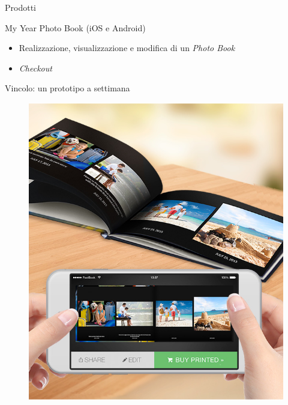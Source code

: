 \begin{frame}{Prodotti}
\begin{minipage}{0.75\textwidth}
\begin{block}{My Year Photo Book (iOS e Android)}
					\begin{itemize}
						\item Realizzazione, visualizzazione e modifica di un \emph{Photo Book}
						\item \emph{Checkout}
					\end{itemize}
					\alert{Vincolo}: un prototipo a settimana
				\end{block}
			\end{minipage}
			\begin{minipage}{0.21\textwidth}
				\begin{figure}
					\centering
					\includegraphics[width=1.0\textwidth]{capitolo_2/immagini/my_year_photo_book.png}
				\end{figure}
			\end{minipage}
		\end{frame}
